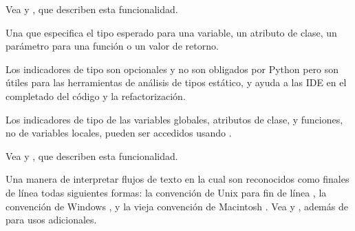 \documentclass[a4,10pt,spanish]{sphinxmanual}
\begin{document}
\begin{description}
\begin{sphinxVerbatim}[commandchars=\\\{\}]
  \PYG{p}{[}\PYG{p}{]}  \PYG{p}{[}\PYG{p}{]}
\end{sphinxVerbatim}

\sphinxAtStartPar
Vea  y , que describen esta funcionalidad.

\item[{indicador de tipo\index{indicador de tipo@\spxentry{indicador de tipo}|spxpagem}\phantomsection\label{\detokenize{glossary:term-type-hint}}}] \leavevmode
\sphinxAtStartPar
Una  {\hyperref[\detokenize{glossary:term-annotation}]{}} que especifica el tipo esperado para una variable, un atributo de clase, un parámetro para una función o un valor de retorno.

\sphinxAtStartPar
Los indicadores de tipo son opcionales y no son obligados por Python pero son útiles para las herramientas de análisis de tipos estático, y ayuda a las IDE en el completado del código y la refactorización.

\sphinxAtStartPar
Los indicadores de tipo de las variables globales, atributos de clase, y funciones, no de variables locales, pueden ser accedidos usando .

\sphinxAtStartPar
Vea  y , que describen esta funcionalidad.

\item[{saltos de líneas universales\index{saltos de líneas universales@\spxentry{saltos de líneas universales}|spxpagem}\phantomsection\label{\detokenize{glossary:term-universal-newlines}}}] \leavevmode
\sphinxAtStartPar
Una manera de interpretar flujos de texto en la cual son reconocidos como finales de línea todas siguientes formas: la convención de Unix para fin de línea , la convención de Windows , y la vieja convención de Macintosh .  Vea  y , además de  para usos adicionales.


\end{description}
\end{document}
